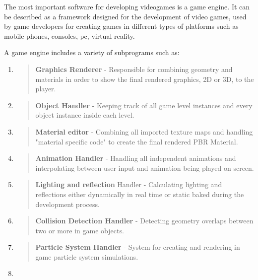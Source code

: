 \documentclass[a4paper,one side,12pt]{book}
\begin{document}
The most important software for developing videogames is a game engine.
It can be described as a framework designed for the development of video
games, used by game developers for creating games in different types of
platforms such as mobile phones, consoles, pc, virtual reality.

A game engine includes a variety of subprograms such as:

\begin{enumerate}
\def\labelenumi{\arabic{enumi}.}
\item
  \begin{quote}
  \textbf{Graphics Renderer} - Responsible for combining geometry and
  materials in order to show the final rendered graphics, 2D or 3D, to
  the player.
  \end{quote}
\item
  \begin{quote}
  \textbf{Object Handler} - Keeping track of all game level instances
  and every object instance inside each level.
  \end{quote}
\item
  \begin{quote}
  \textbf{Material editor} - Combining all imported texture maps and
  handling "material specific code" to create the final rendered PBR
  Material.
  \end{quote}
\item
  \begin{quote}
  \textbf{Animation Handler} - Handling all independent animations and
  interpolating between user input and animation being played on screen.
  \end{quote}
\item
  \begin{quote}
  \textbf{Lighting and reflection} Handler - Calculating lighting and
  reflections either dynamically in real time or static baked during the
  development process.
  \end{quote}
\item
  \begin{quote}
  \textbf{Collision Detection Handler} - Detecting geometry overlaps
  between two or more in game objects.
  \end{quote}
\item
  \begin{quote}
  \textbf{Particle System Handler} - System for creating and rendering
  in game particle system simulations.
  \end{quote}
\item
  \begin{quote}

\end{quote}
\end{enumerate}
\end{document}
